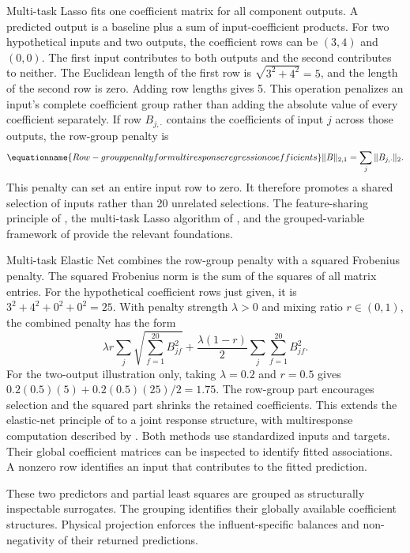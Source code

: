 Multi-task Lasso fits one coefficient matrix for all component outputs. A predicted output is a baseline plus a sum of input-coefficient products. For two hypothetical inputs and two outputs, the coefficient rows can be $(3,4)$ and $(0,0)$. The first input contributes to both outputs and the second contributes to neither. The Euclidean length of the first row is $\sqrt{3^2+4^2}=5$, and the length of the second row is zero. Adding row lengths gives 5. This operation penalizes an input's complete coefficient group rather than adding the absolute value of every coefficient separately. If row $B_{j,\cdot}$ contains the coefficients of input $j$ across those outputs, the row-group penalty is
\begin{equation}
\equationname{Row-group penalty for multiresponse regression coefficients}
\|B\|_{2,1}=\sum_j\|B_{j,\cdot}\|_2.
\label{eq:multiresponse_row_penalty}
\end{equation}
This penalty can set an entire input row to zero. It therefore promotes a shared selection of inputs rather than 20 unrelated selections. The feature-sharing principle of \citet{Argyriou2008}, the multi-task Lasso algorithm of \citet{Liu2009}, and the grouped-variable framework of \citet{Yuan2006} provide the relevant foundations.

Multi-task Elastic Net combines the row-group penalty with a squared Frobenius penalty. The squared Frobenius norm is the sum of the squares of all matrix entries. For the hypothetical coefficient rows just given, it is $3^2+4^2+0^2+0^2=25$. With penalty strength $\lambda>0$ and mixing ratio $r\in(0,1)$, the combined penalty has the form
\[
\lambda r\sum_j\sqrt{\sum_{f=1}^{20}B_{jf}^2}
+\frac{\lambda(1-r)}2\sum_j\sum_{f=1}^{20}B_{jf}^2.
\]
For the two-output illustration only, taking $\lambda=0.2$ and $r=0.5$ gives $0.2(0.5)(5)+0.2(0.5)(25)/2=1.75$. The row-group part encourages selection and the squared part shrinks the retained coefficients. This extends the elastic-net principle of \citet{Zou2005} to a joint response structure, with multiresponse computation described by \citet{Simon2013}. Both methods use standardized inputs and targets. Their global coefficient matrices can be inspected to identify fitted associations. A nonzero row identifies an input that contributes to the fitted prediction.

These two predictors and partial least squares are grouped as structurally inspectable surrogates. The grouping identifies their globally available coefficient structures. Physical projection enforces the influent-specific balances and non-negativity of their returned predictions.

